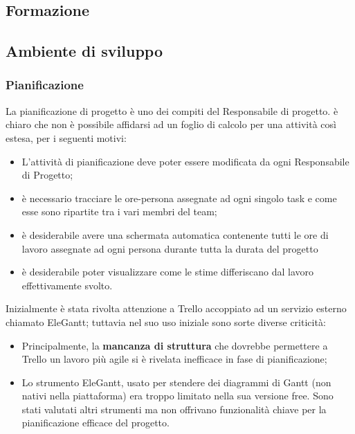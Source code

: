 \subsection{Formazione}

\subsection{Ambiente di sviluppo} 

\subsubsection{Pianificazione}

La pianificazione di progetto è uno dei compiti del Responsabile di progetto. è chiaro che non è possibile affidarsi ad un foglio di calcolo per una attività così estesa, per i seguenti motivi:

\begin{itemize}
\item L'attività di pianificazione deve poter essere modificata da ogni Responsabile di Progetto;
\item è necessario tracciare le ore-persona assegnate ad ogni singolo task e come esse sono ripartite tra i vari membri del team;
\item è desiderabile avere una schermata automatica contenente tutti le ore di lavoro assegnate ad ogni persona durante tutta la durata del progetto
\item è desiderabile poter visualizzare come le stime differiscano dal lavoro effettivamente svolto.
\end{itemize}

Inizialmente è stata rivolta attenzione a Trello accoppiato ad un servizio esterno chiamato EleGantt; tuttavia nel suo uso iniziale sono sorte diverse criticità:

\begin{itemize}
\item Principalmente, la \textbf{mancanza di struttura} che dovrebbe permettere a Trello un lavoro più agile si è rivelata inefficace in fase di pianificazione;
\item Lo strumento EleGantt, usato per stendere dei diagrammi di Gantt (non nativi nella piattaforma) era troppo limitato nella sua versione free. Sono stati valutati altri strumenti ma non offrivano funzionalità chiave per la pianificazione efficace del progetto.
\end{itemize}

